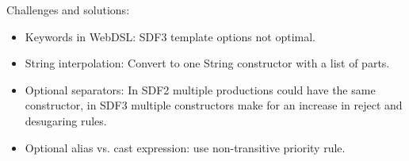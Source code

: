     Challenges and solutions:
    \begin{itemize}
      \item Keywords in WebDSL: SDF3 template options not optimal.
      \item String interpolation: Convert to one String constructor with a list of parts.
      \item Optional separators: In SDF2 multiple productions could have the same constructor, in SDF3 multiple constructors make for an increase in reject and desugaring rules.
      \item Optional alias vs. cast expression: use non-transitive priority rule.
    \end{itemize}
